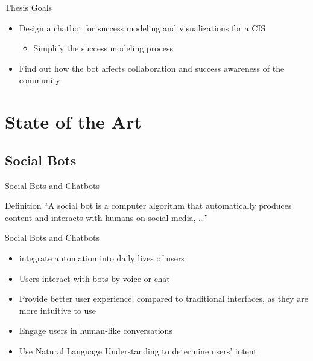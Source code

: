 \begin{frame}{Thesis Goals}
  \begin{itemize}
    \item Design a chatbot for success modeling and visualizations for a CIS
    \begin{itemize}
        \item Simplify the success modeling process
    \end{itemize}
    \item Find out how the bot affects collaboration and success awareness of the community %
  \end{itemize}
\end{frame}







\section{State of the Art}

\subsection{Social Bots}
\begin{frame}{Social Bots and Chatbots}
  \begin{block}{Definition}
    ``A social bot is a computer algorithm that automatically produces content and interacts with humans on social media, \dots'' \cite{FVD*16b}
  \end{block}
\end{frame}

\begin{frame}{Social Bots and Chatbots}
  \begin{itemize}
    \item integrate automation into daily lives of users  %
    \item Users interact with bots by voice or chat %
    \item Provide better user experience, compared to traditional interfaces, as they are more intuitive to use
    \item Engage users in human-like conversations 
    \item Use Natural Language Understanding to determine users' intent
\end{itemize}
\end{frame}


